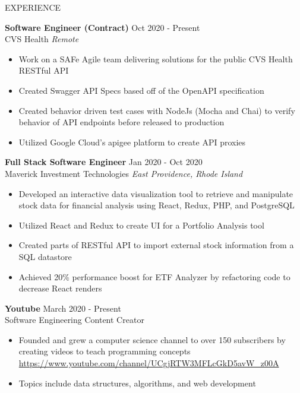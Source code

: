 \documentclass{resume} %
\begin{document}
\begin{rSection}{EXPERIENCE}

 \textbf{Software Engineer (Contract)} \hfill  Oct 2020 - Present\\
CVS Health \hfill \textit{Remote}
 \begin{itemize}
    \itemsep -3pt {} 
     \item Work on a SAFe Agile team delivering solutions for the public CVS Health RESTful API 
     \item Created Swagger API Specs based off of the OpenAPI specification
     \item Created behavior driven test cases with NodeJs (Mocha and Chai) to verify behavior of API endpoints before released to production
     \item Utilized Google Cloud's apigee platform to create API proxies

    
 \end{itemize}

\textbf{Full Stack Software Engineer} \hfill Jan 2020 - Oct 2020\\
Maverick Investment Technologies \hfill \textit{East Providence, Rhode Island}
 \begin{itemize}
    \itemsep -3pt {} 
    \item Developed an interactive data visualization tool to retrieve and manipulate stock data for financial analysis using React, Redux, PHP, and PostgreSQL
    \item Utilized React and Redux to create UI for a Portfolio Analysis tool
    \item Created parts of RESTful API to import external stock information from a SQL datastore 
     \item Achieved 20\% performance boost for ETF Analyzer by refactoring code to decrease React renders
 \end{itemize}
 
\textbf{Youtube} \hfill  March 2020 - Present\\
Software Engineering Content Creator \hfill 
 \begin{itemize}
    \itemsep -3pt {} 
     \item Founded and grew a computer science channel to over 150 subscribers by creating videos to teach programming concepts 
     \href{https://www.youtube.com/channel/UCgjRTW3MFLcGkD5avW_z00A}{https://www.youtube.com/channel/UCgjRTW3MFLcGkD5avW_z00A}
     \item Topics include data structures, algorithms, and web development
     
   
 \end{itemize}


\end{rSection} 
\end{document}
